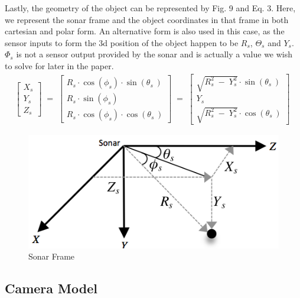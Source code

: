 \documentclass[a4paper]{IEEEtran}
\let\Theta\varTheta
\let\Phi\varPhi
\newcommand{\RSonar}{$\si{\textit{R}_{s}}$\xspace}
\newcommand{\ThetaSonar}{$\si{\Theta_{s}}$\xspace}
\newcommand{\PhiSonar}{$\si{\Phi_{s}}$\xspace}
\newcommand{\YSonar}{$\si{\textit{Y}_{s}}$\xspace}
\begin{document}
Lastly, the geometry of the object can be represented by Fig. 9 and Eq. 3. Here, we represent the sonar frame and the object coordinates in that frame in both cartesian and polar form. An alternative form is also used in this case, as the sensor inputs to form the 3d position of the object happen to be \RSonar, \ThetaSonar and \YSonar. \PhiSonar is not a sensor output provided by the sonar and is actually a value we wish to solve for later in the paper.
\begingroup\makeatletter\def\f@size{7}\check@mathfonts
\begin{gather}
\left[ \begin{array}{c} X_{s} \\ Y_{s} \\ Z_{s} \end{array} \right]\; =\; \left[ \begin{array}{c} R_{s}\cdot \cos \left( \phi _{s} \right)\cdot \sin \left( \theta _{s\; } \right) \\ R_{s}\cdot \sin \left( \phi _{s} \right) \\ R_{s}\cdot \cos \left( \phi _{s} \right)\cdot \cos \left( \theta _{s\; } \right) \end{array} \right]\; =\; \left[ \begin{array}{c} \sqrt{R_{s}^{2}\; -\; Y_{s}^{2}}\cdot \sin \left( \theta _{s\; } \right) \\ Y_{s} \\ \sqrt{R_{s}^{2}\; -\; Y_{s}^{2}}\cdot \cos \left( \theta _{s\; } \right) \end{array} \right]\; 
\end{gather}
\endgroup

\begin{figure}[h!]
  \centering
  \includegraphics[scale=0.4]{sonarframe}
  \captionsetup{justification=centering}
  \caption{Sonar Frame}
\end{figure}

\subsection{Camera Model}
\end{document}
